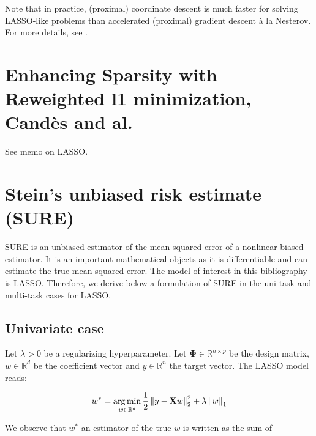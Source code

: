 \documentclass[a4paper,10pt]{article}
\theoremstyle{definition}
\begin{document}
\vskip 0.1in

Note that in practice, (proximal) coordinate descent is much faster for solving LASSO-like problems than accelerated (proximal) gradient descent à la Nesterov.
For more details, see \cite{Bertrand_Massias_Anderson}.

\section{Enhancing Sparsity with Reweighted l1 minimization, Candès and al.}

See memo on LASSO.

\section{Stein's unbiased risk estimate (SURE)}

SURE is an unbiased estimator of the mean-squared error of a nonlinear biased estimator.
It is an important mathematical objects as it is differentiable and can estimate the true
mean squared error. The model of interest in this bibliography is LASSO. Therefore, we derive below a formulation of SURE in
the uni-task and multi-task cases for LASSO.

\subsection*{Univariate case}

Let $\lambda > 0$ be a regularizing hyperparameter. Let $\mathbf{\Phi} \in \mathbb{R}^{n\times p}$ be the design matrix,
$w \in \mathbb{R}^d$ be the coefficient vector and $y \in \mathbb{R}^n$ the target vector.
The LASSO model reads:

\begin{equation*}
    w^* = \operatorname*{arg\,min}_{w \in \mathbb{R}^d} \frac{1}{2}\left \lVert y - \mathbf{X}w \right \rVert_2^2 + \lambda \left \lVert w \right \rVert_1
\end{equation*}

We observe that $w^*$ an estimator of the true $w$ is written as the sum of

\newpage


\end{document}
